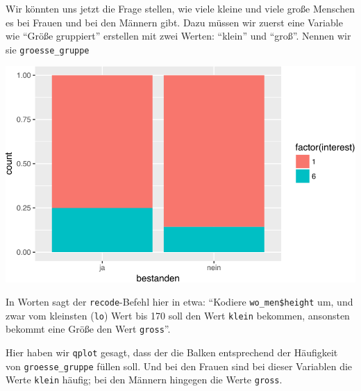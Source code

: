 \documentclass[12pt,ngerman,]{book}
\newenvironment{Shaded}{\begin{snugshade}}{\end{snugshade}}
\newcommand{\KeywordTok}[1]{\textcolor[rgb]{0.13,0.29,0.53}{\textbf{{#1}}}}
\newcommand{\DataTypeTok}[1]{\textcolor[rgb]{0.13,0.29,0.53}{{#1}}}
\newcommand{\DecValTok}[1]{\textcolor[rgb]{0.00,0.00,0.81}{{#1}}}
\newcommand{\StringTok}[1]{\textcolor[rgb]{0.31,0.60,0.02}{{#1}}}
\newcommand{\NormalTok}[1]{{#1}}
\renewenvironment{Shaded}{\begin{kframe}}{\end{kframe}}
\begin{document}
Wir könnten uns jetzt die Frage stellen, wie viele kleine und viele
große Menschen es bei Frauen und bei den Männern gibt. Dazu müssen wir
zuerst eine Variable wie ``Größe gruppiert'' erstellen mit zwei Werten:
``klein'' und ``groß''. Nennen wir sie \texttt{groesse\_gruppe}

\begin{Shaded}
\end{Shaded}

\begin{center}\includegraphics[width=0.7\linewidth]{050_Daten_visualisieren_files/figure-latex/unnamed-chunk-20-1} \end{center}

In Worten sagt der \texttt{recode}-Befehl hier in etwa: ``Kodiere
\texttt{wo\_men\$height} um, und zwar vom kleinsten (\texttt{lo}) Wert
bis 170 soll den Wert \texttt{klein} bekommen, ansonsten bekommt eine
Größe den Wert \texttt{gross}''.

Hier haben wir \texttt{qplot} gesagt, dass der die Balken entsprechend
der Häufigkeit von \texttt{groesse\_gruppe} füllen soll. Und bei den
Frauen sind bei dieser Variablen die Werte \texttt{klein} häufig; bei
den Männern hingegen die Werte \texttt{gross}.
\end{document}
